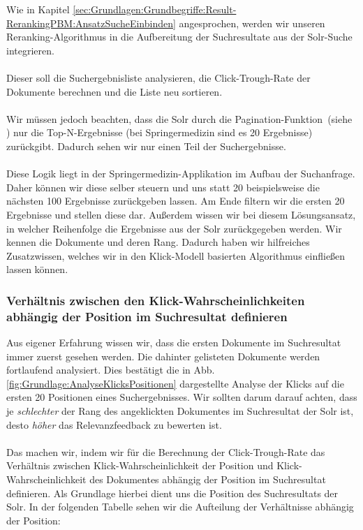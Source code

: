Wie in Kapitel \ref{sec:Grundlagen:Grundbegriffe:Result-RerankingPBM:AnsatzSucheEinbinden} angesprochen, werden wir unseren Reranking-Algorithmus in die Aufbereitung der Suchresultate aus der Solr-Suche integrieren.
\\
\\
Dieser soll die Suchergebnisliste analysieren, die Click-Trough-Rate der Dokumente berechnen und die Liste neu sortieren. 
\\
\\
Wir müssen jedoch beachten, dass die Solr durch die Pagination-Funktion~(siehe \cite{Pagination}) nur die Top-N-Ergebnisse (bei Springermedizin sind es 20 Ergebnisse) zurückgibt. Dadurch sehen wir nur einen Teil der Suchergebnisse. 
\\
\\
Diese Logik liegt in der Springermedizin-Applikation im Aufbau der Suchanfrage. Daher können wir diese selber steuern und uns statt 20 beispielsweise die nächsten 100 Ergebnisse zurückgeben lassen. Am Ende filtern wir die ersten 20 Ergebnisse und stellen diese dar. Außerdem wissen wir bei diesem Lösungsansatz, in welcher Reihenfolge die Ergebnisse aus der Solr zurückgegeben werden. Wir kennen die Dokumente und deren Rang. Dadurch haben wir hilfreiches Zusatzwissen, welches wir in den Klick-Modell basierten Algorithmus einfließen lassen können.

\subsubsection{Verhältnis zwischen den Klick-Wahrscheinlichkeiten abhängig der Position im Suchresultat definieren}
\label{sec:Reranking:Methodik:Result-RerankingPBM:VerhaeltnisKlick-Wahrscheinlichkeiten}

Aus eigener Erfahrung wissen wir, dass die ersten Dokumente im Suchresultat immer zuerst gesehen werden. Die dahinter gelisteten Dokumente werden fortlaufend analysiert. Dies bestätigt die in Abb. \ref{fig:Grundlage:AnalyseKlicksPositionen} dargestellte Analyse der Klicks auf die ersten 20 Positionen eines Suchergebnisses. Wir sollten darum darauf achten, dass je \textit{schlechter} der Rang des angeklickten Dokumentes im Suchresultat der Solr ist, desto \textit{höher} das Relevanzfeedback zu bewerten ist. 
\\
\\
Das machen wir, indem wir für die Berechnung der Click-Trough-Rate das Verhältnis zwischen Klick-Wahrscheinlichkeit der Position und Klick-Wahrscheinlichkeit des Dokumentes abhängig der Position im Suchresultat definieren. Als Grundlage hierbei dient uns die Position des Suchresultats der Solr. In der folgenden Tabelle sehen wir die Aufteilung der Verhältnisse abhängig der Position:

